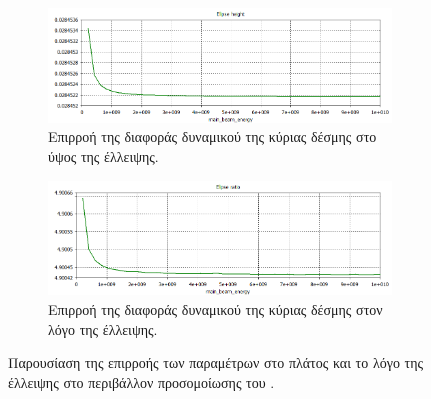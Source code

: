 \begin{figure}[tph]
\begin{subfigure}{0.47\textwidth}
		\label{fig:CST-ellipse-ratio-by-vertical-offset}
	\end{subfigure}
	\par\bigskip
	\begin{subfigure}{0.47\textwidth}
		\includegraphics[width=\linewidth]{figures/CST-variable-analysis/CST-ellipse-height-by-voltage}
		\centering
		\caption{Επιρροή της διαφοράς δυναμικού της κύριας δέσμης στο ύψος της έλλειψης.}
		\label{fig:CST-ellipse-height-by-voltage}
	\end{subfigure}
	\hfill
	\begin{subfigure}{0.47\textwidth}
		\includegraphics[width=\linewidth]{figures/CST-variable-analysis/CST-ellipse-ratio-by-voltage}
		\centering
		\caption{Επιρροή της διαφοράς δυναμικού της κύριας δέσμης στον λόγο της έλλειψης.}
		\label{fig:CST-ellipse-ratio-by-voltages}
	\end{subfigure}
\caption{Παρουσίαση της επιρροής των παραμέτρων στο πλάτος και το λόγο της έλλειψης στο περιβάλλον προσομοίωσης του .}	
\label{fig:EBS-CST-variables}
\end{figure}


